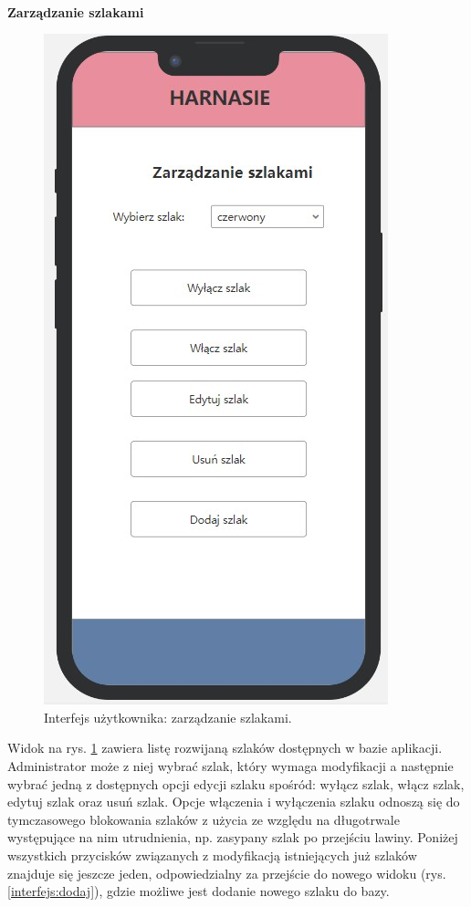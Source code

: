    \\
   \textbf{Zarządzanie szlakami}
     \begin{figure}[H]
        \centering
        \includegraphics[scale=0.5]{img/interfejsy/if_zarzadzaj_szlaki.jpg}
        \caption{Interfejs użytkownika: zarządzanie szlakami.}
        \label{interfejs:szlaki}
    \end{figure}
   Widok na rys. \ref{interfejs:szlaki} zawiera listę rozwijaną szlaków dostępnych w bazie aplikacji. Administrator może z niej wybrać szlak, który wymaga modyfikacji a następnie wybrać jedną z dostępnych opcji edycji szlaku spośród: wyłącz szlak, włącz szlak, edytuj szlak oraz usuń szlak. Opcje włączenia i wyłączenia szlaku odnoszą się do tymczasowego blokowania szlaków z użycia ze względu na długotrwale występujące na nim utrudnienia, np. zasypany szlak po przejściu lawiny. Poniżej wszystkich przycisków związanych z modyfikacją istniejących już szlaków znajduje się jeszcze jeden, odpowiedzialny za  przejście do nowego widoku (rys. \ref{interfejs:dodaj}), gdzie możliwe jest dodanie nowego szlaku do bazy. \\
